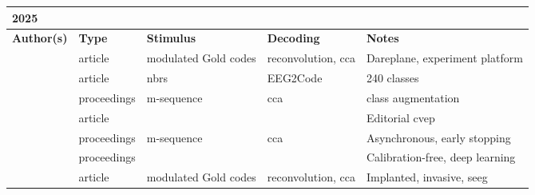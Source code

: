 \documentclass[a4paper,landscape]{article}
\begin{document}
	
\begin{table}[H]
	\begin{tabular}{p{5cm}p{2cm}p{5cm}p{5cm}p{6.5cm}}
		\textbf{2025} & & & & \\ 
		\toprule
		\textbf{Author(s)} & \textbf{Type} & \textbf{Stimulus} & \textbf{Decoding} & \textbf{Notes} \\ 
		\midrule
		\citeauthor{dold2025} & article & modulated Gold codes & reconvolution, \acrshort{cca} & Dareplane, experiment platform \\
		\citeauthor{dong2025} & article & \acrshort{nbrs} & EEG2Code & 240 classes \\
		\citeauthor{fodor2025} & proceedings & m-sequence & \acrshort{cca} & class augmentation \\
		\citeauthor{martinez2025a} & article &  &  & Editorial \acrshort{cvep} \\
		\citeauthor{martinez2025b} & proceedings &  m-sequence & \acrshort{cca} & Asynchronous, early stopping \\
		\citeauthor{santamaria2025} & proceedings & & & Calibration-free, deep learning \\
		\cite{thielen2025} & article & modulated Gold codes & reconvolution, \acrshort{cca} & Implanted, invasive, \acrshort{seeg} \\
		\bottomrule
	\end{tabular}
\end{table}
	
\end{document}
